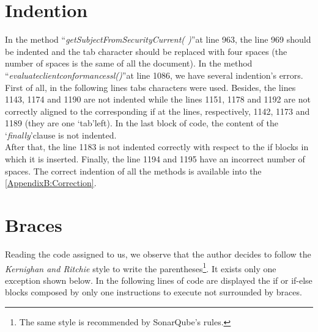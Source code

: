 \documentclass[\mainpath/main]{subfiles}
\begin{document}
\section{Indention}
\label{CodeInspectionChecklist:Indention}
In the method \textquotedblleft \textit{getSubjectFromSecurityCurrent( )}\textquotedblright at line 963, the line 969 should be indented and the tab character should be replaced with four spaces (the number of spaces is the same of all the document).
In the method \textquotedblleft \textit{evaluate\textunderscore client\textunderscore conformance\textunderscore ssl(\textellipsis)}\textquotedblright at line 1086, we have several indention's errors.\\
First of all, in the following lines tabs characters were used.
Besides, the lines 1143, 1174 and 1190 are not indented while the lines 1151, 1178 and 1192 are not correctly aligned to the corresponding if at the lines, respectively, 1142, 1173 and 1189 (they are one \textquoteleft tab\textquoteright left).
In the last block of code, the content of the \textquoteleft \textit{finally}\textquoteright clause is not indented.\\
After that, the line 1183 is not indented correctly with respect to the if blocks in which it is inserted.
Finally, the line 1194 and 1195 have an incorrect number of spaces.
The correct indention of all the methods is available into the \autoref{AppendixB:Correction}.

\section{Braces}
\label{CodeInspectionChecklist:Braces}
Reading the code assigned to us, we observe that the author decides to follow the \textit{Kernighan and Ritchie} style to write the parentheses\footnote{The same style is recommended by SonarQube's rules.}. It exists only one exception shown below.
In the following lines of code are displayed the if or if-else blocks composed by only one instructions to execute not surrounded by braces.
\end{document}
